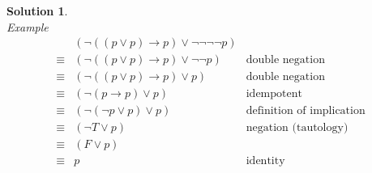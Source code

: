 \documentclass{article}
\theoremstyle{definition}
\newtheorem*{solution}{Solution}
\begin{document}
\begin{solution}\ \\
\textit{Example}
\begin{align*}
 & (\neg ((p \vee p) \to p) \vee \neg \neg \neg \neg p) & \\
\equiv & (\neg ((p \vee p) \to p) \vee \neg \neg p) & \text{double negation}\\
\equiv & (\neg ((p \vee p) \to p) \vee p) & \text{double negation}\\
\equiv & (\neg (p \to p) \vee p) & \text{idempotent}\\
\equiv & (\neg (\neg p \vee p) \vee p) & \text{definition of implication}\\
\equiv & (\neg T \vee p) & \text{negation (tautology)}\\
\equiv & (F \vee p) &\\
\equiv & p & \text{identity}
\end{align*}
\end{solution}

\end{document}
